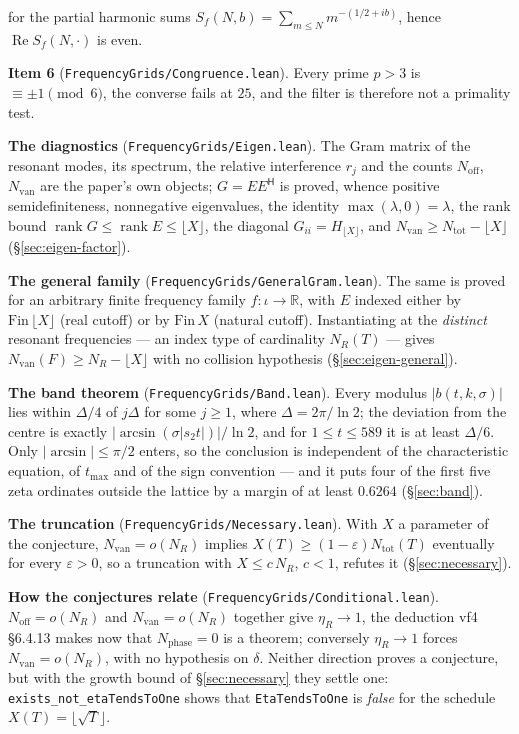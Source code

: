 \documentclass[11pt,a4paper]{article}
\newcommand{\R}{\mathbb{R}}
\newcommand{\lb}{\_\allowbreak}
\newcommand{\code}[1]{\texttt{#1}}
\theoremstyle{definition}
\theoremstyle{remark}
\begin{document}
{  for the partial harmonic sums $S_f(N,b)=\sum_{m\le N}m^{-(1/2+ib)}$, hence
  $\operatorname{Re}S_f(N,\cdot)$ is even.
\item \textbf{Item 6} (\code{FrequencyGrids/Congruence.lean}). Every prime $p>3$ is
  $\equiv\pm1\pmod 6$, the converse fails at $25$, and the filter is therefore not a
  primality test.
\item \textbf{The diagnostics} (\code{FrequencyGrids/Eigen.lean}). The Gram matrix of the
  resonant modes, its spectrum, the relative interference $r_j$ and the counts
  $N_{\mathrm{off}}$, $N_{\mathrm{van}}$ are the paper's own objects; $G=E E^{\mathsf H}$ is
  proved, whence positive semidefiniteness, nonnegative eigenvalues, the identity
  $\max(\lambda,0)=\lambda$, the rank bound $\operatorname{rank}G\le\operatorname{rank}E\le
  \lfloor X\rfloor$, the diagonal $G_{ii}=H_{\lfloor X\rfloor}$, and
  $N_{\mathrm{van}}\ge N_{\mathrm{tot}}-\lfloor X\rfloor$ (\S\ref{sec:eigen-factor}).
\item \textbf{The general family} (\code{FrequencyGrids/GeneralGram.lean}). The same is proved
  for an arbitrary finite frequency family $f:\iota\to\R$, with $E$ indexed either by
  $\mathrm{Fin}\,\lfloor X\rfloor$ (real cutoff) or by $\mathrm{Fin}\,X$ (natural cutoff).
  Instantiating at the \emph{distinct} resonant frequencies --- an index type of cardinality
  $N_R(T)$ --- gives $N_{\mathrm{van}}(F)\ge N_R-\lfloor X\rfloor$ with no collision
  hypothesis (\S\ref{sec:eigen-general}).
\item \textbf{The band theorem} (\code{FrequencyGrids/Band.lean}). Every modulus
  $|b(t,k,\sigma)|$ lies within $\Delta/4$ of $j\Delta$ for some $j \ge 1$, where
  $\Delta = 2\pi/\ln 2$; the deviation from the centre is exactly
  $|\arcsin(\sigma|s_2 t|)|/\ln 2$, and for $1 \le t \le 589$ it is at least $\Delta/6$. Only
  $|\arcsin| \le \pi/2$ enters, so the conclusion is independent of the characteristic equation,
  of $t_{\max}$ and of the sign convention --- and it puts four of the first five zeta ordinates
  outside the lattice by a margin of at least $0.6264$ (\S\ref{sec:band}).
\item \textbf{The truncation} (\code{FrequencyGrids/Necessary.lean}). With $X$ a parameter of
  the conjecture, $N_{\mathrm{van}}=o(N_R)$ implies $X(T)\ge(1-\varepsilon)N_{\mathrm{tot}}(T)$
  eventually for every $\varepsilon>0$, so a truncation with $X\le c\,N_R$, $c<1$, refutes it
  (\S\ref{sec:necessary}).
\item \textbf{How the conjectures relate} (\code{FrequencyGrids/\allowbreak Conditional.lean}).
  $N_{\mathrm{off}}=o(N_R)$ and $N_{\mathrm{van}}=o(N_R)$ together give $\eta_R\to1$, the
  deduction vf4 \S6.4.13 makes now that $N_{\mathrm{phase}}=0$ is a theorem; conversely
  $\eta_R\to1$ forces $N_{\mathrm{van}}=o(N_R)$, with no hypothesis on $\delta$.  Neither
  direction proves a conjecture, but with the growth bound of \S\ref{sec:necessary} they
  settle one: \code{exists\lb not\lb etaTendsToOne} shows that \code{EtaTendsToOne} is
  \emph{false} for the schedule $X(T)=\lfloor\sqrt{T}\rfloor$.
}
\end{document}

